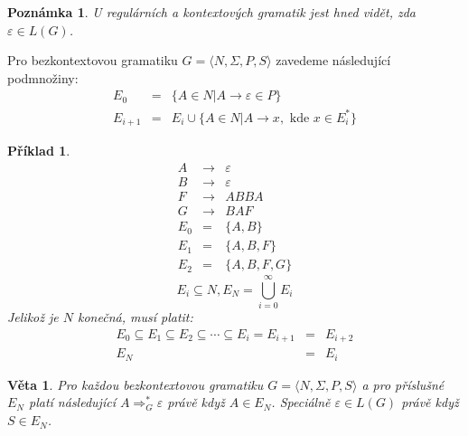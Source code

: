 \documentclass[10pt, a4paper, titlepage]{article}
\theoremstyle{note}
\newtheorem{veta}{Věta}
\newtheorem{priklad}{Příklad}
\newtheorem{poznamka}{Poznámka}
\begin{document}
\begin{poznamka}
U regulárních a kontextových gramatik jest hned vidět, zda $\varepsilon \in L(G)$.
\end{poznamka}

Pro bezkontextovou gramatiku $G = \langle N, \Sigma, P,S \rangle$ zavedeme následující podmnožiny:
\begin{eqnarray*}
E_{0} &=& \lbrace A \in N | A \rightarrow \varepsilon \in P \rbrace \\
E_{i+1} &=& E_{i} \cup \lbrace A \in N | A \rightarrow x, \text{ kde } x \in E_{i}^* \rbrace
\end{eqnarray*}

\begin{priklad}
\begin{eqnarray*}
A &\rightarrow& \varepsilon \\
B &\rightarrow& \varepsilon \\
F &\rightarrow& ABBA \\
G &\rightarrow& BAF \\
E_{0} &=& \lbrace A, B \rbrace \\
E_{1} &=& \lbrace A, B, F \rbrace \\
E_{2} &=& \lbrace A, B, F, G \rbrace
\end{eqnarray*}
$$
E_{i} \subseteq N, E_{N} = \bigcup_{i=0}^{\infty} E_{i}
$$
Jelikož je $N$ konečná, musí platit:
\begin{eqnarray*}
E_{0} \subseteq E_{1} \subseteq E_{2} \subseteq \cdots \subseteq E_{i} = E_{i+1} &=& E_{i+2} \\
E_{N} &=& E_{i}
\end{eqnarray*}
\end{priklad}

\begin{veta}
Pro každou bezkontextovou gramatiku $G = \langle N, \Sigma, P,S \rangle$ a pro příslušné $E_{N}$ platí následující $A \Rightarrow_{G}^{*}\varepsilon$ právě když $A \in E_{N}$. 
Speciálně $\varepsilon \in L(G)$ právě když $S \in E_{N}$.
\end{veta}
\end{document}
